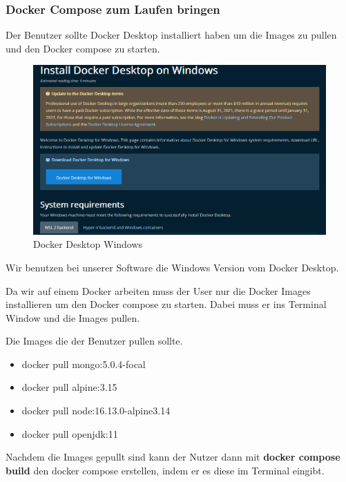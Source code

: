 \subsubsection{Docker Compose zum Laufen bringen}
Der Benutzer sollte Docker Desktop installiert haben um die Images zu pullen und den Docker compose zu starten.

\begin{figure}[H]
    \centering
    \includegraphics[width=1.0\textwidth]{bilder/installationshandbuch/Docker_Desktop.PNG}
    \caption{Docker Desktop Windows}
    \label{fig:Docker_Desktop_Windows}
\end{figure}
\noindent Wir benutzen bei unserer Software die Windows Version vom Docker Desktop.\newline

\noindent Da wir auf einem Docker arbeiten muss der User nur die Docker Images installieren um den Docker compose zu starten.\newline
Dabei muss er ins Terminal Window und die Images pullen.\newline


\noindent Die Images die der Benutzer pullen sollte.

\begin{itemize}
    \item docker pull mongo:5.0.4-focal
    \item docker pull alpine:3.15
    \item docker pull node:16.13.0-alpine3.14
    \item docker pull openjdk:11
\end{itemize}

\noindent Nachdem die Images gepullt sind kann der Nutzer dann mit \textbf{docker compose build} den docker compose erstellen, indem er es diese 
im Terminal eingibt.\newline

